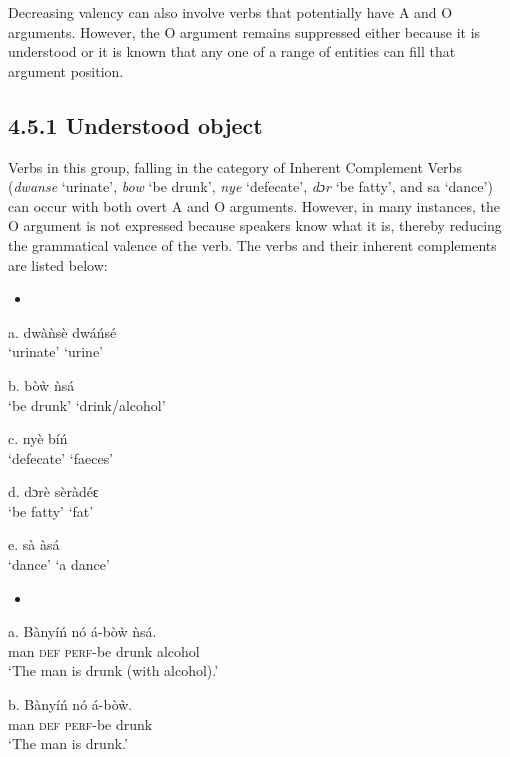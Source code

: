 \documentclass[output=paper]{langsci/langscibook}
\begin{document}
Decreasing valency can also involve verbs that potentially have A and O arguments. However, the O argument remains suppressed either because it is understood or it is known that any one of a range of entities can fill that argument position.

\subsection{4.5.1  Understood object}

Verbs in this group, falling in the category of Inherent Complement Verbs (\emph{dwanse} ‘urinate’, \emph{bow} ‘be drunk’, \emph{nye} ‘defecate’, \emph{dɔr} ‘be fatty’, and sa ‘dance’) can occur with both overt A and O arguments. However, in many instances, the O argument is not expressed because speakers know what it is, thereby reducing the grammatical valence of the verb. The verbs and their inherent complements are listed below:

\begin{itemize}
\item \end{itemize}
\gll a.  dw\`{a}\`{n}s\`{e}   dw\'{a}\'{n}s\'{e}\\
\glt   ‘urinate’  ‘urine’
\z

\gll  b.  b\`{o}\`{w}    \`{n}s\'{a}\\
\glt   ‘be drunk’  ‘drink/alcohol’
\z

\gll  c.  ny\`{e}    b\'{i}\'{n}\\
\glt   ‘defecate’  ‘faeces’
\z

\gll  d.  dɔr\`{e}    s\`{e}r\`{a}d\'{e}ԑ\\
\glt   ‘be fatty’  ‘fat’
\z

\gll  e.  s\`{a}    \`{a}s\'{a}\\
\glt   ‘dance’    ‘a dance’
\z

\begin{itemize}
\item \end{itemize}
\gll a.  B\`{a}ny\'{i}\'{n}  n\'{o}  \'{a}-b\`{o}\`{w}    \`{n}s\'{a}.\\
       man  \textsc{def}  \textsc{perf}{}-be drunk  alcohol\\
\glt ‘The man is drunk (with alcohol).’
\z

\gll  b.  B\`{a}ny\'{i}\'{n}  n\'{o}  \'{a}-b\`{o}\`{w}.\\
       man  \textsc{def}  \textsc{perf}{}-be drunk\\
\glt ‘The man is drunk.’
\z
\end{document}
